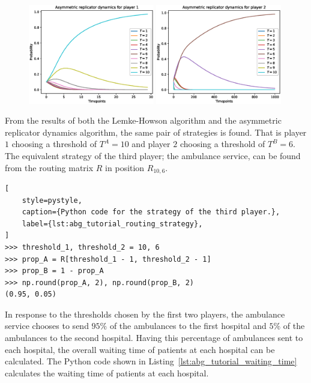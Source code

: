 \begin{figure}[H]
    \centering
    \includegraphics[width=0.49\textwidth]{chapters/00_appendix/01_ambulance_game_library/Bin/ard_p1.eps}
    \includegraphics[width=0.49\textwidth]{chapters/00_appendix/01_ambulance_game_library/Bin/ard_p2.eps}
\end{figure}


From the results of both the Lemke-Howson algorithm and the asymmetric
replicator dynamics algorithm, the same pair of strategies is found.
That is player \(1\) choosing a threshold of \(T^A = 10\) and player \(2\)
choosing a threshold of \(T^B = 6\).
The equivalent strategy of the third player; the ambulance service, can be
found from the routing matrix \(R\) in position \(R_{10, 6}\).


\begin{lstlisting}[
    style=pystyle,
    caption={Python code for the strategy of the third player.},
    label={lst:abg_tutorial_routing_strategy},
]
>>> threshold_1, threshold_2 = 10, 6
>>> prop_A = R[threshold_1 - 1, threshold_2 - 1]
>>> prop_B = 1 - prop_A
>>> np.round(prop_A, 2), np.round(prop_B, 2)
(0.95, 0.05)

\end{lstlisting}

In response to the thresholds chosen by the first two players, the ambulance
service chooses to send \(95\%\) of the ambulances to the first hospital and
\(5\%\) of the ambulances to the second hospital.
Having this percentage of ambulances sent to each hospital, the overall waiting
time of patients at each hospital can be calculated.
The Python code shown in Listing~\ref{lst:abg_tutorial_waiting_time} calculates
the waiting time of patients at each hospital.

